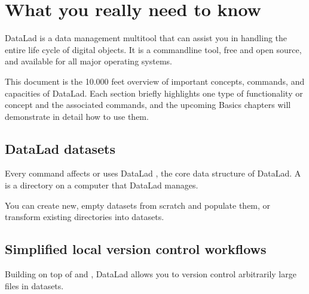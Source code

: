 \chapter{What you really need to know}
\label{\detokenize{intro/executive_summary:what-you-really-need-to-know}}\label{\detokenize{intro/executive_summary:executive-summary}}\label{\detokenize{intro/executive_summary::doc}}
\sphinxAtStartPar
DataLad is a data management multitool that can assist you in handling the entire
life cycle of digital objects. It is a command\sphinxhyphen{}line tool, free and open source, and
available for all major operating systems.

\sphinxAtStartPar
This document is the 10.000 feet overview of important concepts, commands, and
capacities of DataLad. Each section briefly highlights one type of functionality or
concept and the associated commands, and the upcoming Basics chapters will demonstrate
in detail how to use them.


\section{DataLad datasets}
\label{\detokenize{intro/executive_summary:datalad-datasets}}
\sphinxAtStartPar
Every command affects or uses DataLad , the core data structure of
DataLad. A  is a directory on a computer that DataLad manages.

\begin{figure}[tbp]
\centering

\noindent{}
\end{figure}

\sphinxAtStartPar
You can create new, empty datasets from scratch and populate them,
or transform existing directories into datasets.


\section{Simplified local version control workflows}
\label{\detokenize{intro/executive_summary:simplified-local-version-control-workflows}}
\sphinxAtStartPar
Building on top of {\hyperref[\detokenize{glossary:term-Git}]{}} and {\hyperref[\detokenize{glossary:term-git-annex}]{}}, DataLad allows you to
version control arbitrarily large files in datasets.

